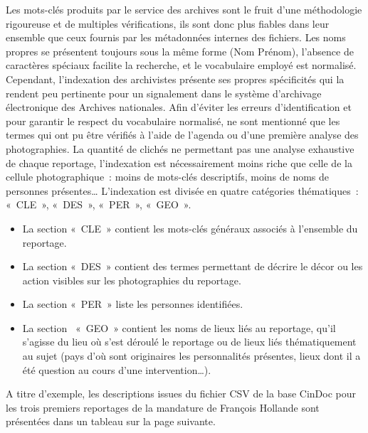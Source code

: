 Les mots-clés produits par le service des archives sont le fruit d’une méthodologie rigoureuse et de multiples vérifications, ils sont donc plus fiables dans leur ensemble que ceux fournis par les métadonnées internes des fichiers. Les noms propres se présentent toujours sous la même forme (Nom Prénom), l’absence de caractères spéciaux facilite la recherche, et le vocabulaire employé est normalisé. Cependant, l’indexation des archivistes présente ses propres spécificités qui la rendent peu pertinente pour un signalement dans le système d’archivage électronique des Archives nationales. Afin d’éviter les erreurs d’identification et pour garantir le respect du vocabulaire normalisé, ne sont mentionné que les termes qui ont pu être vérifiés à l’aide de l’agenda ou d’une première analyse des photographies. La quantité de clichés ne permettant pas une analyse exhaustive de chaque reportage, l’indexation est nécessairement moins riche que celle de la cellule photographique : moins de mots-clés descriptifs, moins de noms de personnes présentes… L’indexation est divisée en quatre catégories thématiques : « CLE », « DES », « PER », « GEO ». 
\begin{itemize}
	\item La section « CLE » contient les mots-clés généraux associés à l’ensemble du reportage. 
	\item La section « DES » contient des termes permettant de décrire le décor ou les action visibles sur les photographies du reportage. 
	\item La section « PER » liste les personnes identifiées.
	\item La section  « GEO » contient les noms de lieux liés au reportage, qu’il s’agisse du lieu où s’est déroulé le reportage ou de lieux liés thématiquement au sujet (pays d’où sont originaires les personnalités présentes, lieux dont il a été question au cours d’une intervention…).
\end{itemize}

A titre d'exemple, les descriptions issues du fichier CSV de la base CinDoc pour les trois premiers reportages de la mandature de François Hollande sont présentées dans un tableau sur la page suivante. 
\newpage

